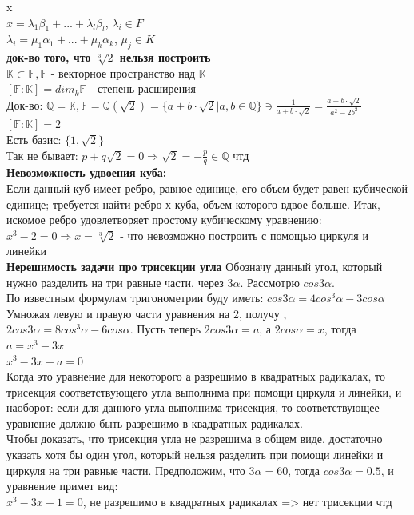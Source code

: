 \documentclass[12pt, oneside]{book}
\theoremstyle{definition}
\begin{document}
\begin{enumerate}
x \\
$x = {\lambda_1}{\beta_1} + ... + {\lambda_l}{\beta_l}$, ${\lambda_i} \in {F}$\\
${\lambda_i} = {\mu_1}{\alpha_1} + ... + {\mu_k}{\alpha_k}$, ${\mu_j} \in {K}$\\
\textbf{док-во того, что $\sqrt[3]{2}$ нельзя построить}\\
$\mathbb{K} \subset \mathbb{F}, \mathbb{F}$ - векторное пространство над $\mathbb{K}$\\
$[\mathbb{F}: \mathbb{K}] = dim_k \mathbb{F}$ - степень расширения \\
Док-во: $\mathbb{Q} = \mathbb{K}, \mathbb{F} = \mathbb{Q} (\sqrt{2}) = \{a + b\cdot \sqrt{2} | a,b \in \mathbb{Q} \} \ni \frac{1}{a+b\cdot \sqrt{2}} = \frac{a-b\cdot \sqrt{2}}{a^2 - 2b^2}$\\
$[\mathbb{F}: \mathbb{K}] = 2$\\
Есть базис: $\{1,\sqrt{2}\}$\\
Так не бывает: $p+q\sqrt{2} = 0 \Longrightarrow \sqrt{2} = -\frac{p}{q} \in \mathbb{Q}$ чтд\\
\textbf{Невозможность удвоения куба:}\\
Если данный куб имеет ребро, равное единице, его объем будет равен кубической единице; требуется найти ребро х куба, объем которого вдвое больше. Итак, искомое ребро удовлетворяет простому кубическому уравнению: $x^3 - 2 = 0 \Longrightarrow x = \sqrt[3]{2}$ - что невозможно построить с помощью циркуля и линейки\\
\textbf{Нерешимость задачи про трисекции угла}
Обозначу данный угол, который нужно разделить на три равные части, через $3\alpha$. Рассмотрю $cos 3\alpha$.\\
По известным формулам тригонометрии буду иметь:
$cos 3\alpha = 4cos^3 \alpha - 3cos \alpha$\\
Умножая левую и правую части уравнения на 2, получу , $2cos 3\alpha = 8cos^3 \alpha - 6cos\alpha$. Пусть теперь $2cos 3\alpha = a$, а $2cos \alpha =x$, тогда $a = x^3 - 3x$\\
$x^3 - 3x - a =0$\\
Когда это уравнение для некоторого а разрешимо в квадратных радикалах, то трисекция соответствующего угла выполнима при помощи циркуля и линейки, и наоборот: если для данного угла выполнима трисекция, то соответствующее уравнение должно быть разрешимо в квадратных радикалах.\\
Чтобы доказать, что трисекция угла не разрешима в общем виде, достаточно указать хотя бы один угол, который нельзя разделить при помощи линейки и циркуля на три равные части. Предположим, что $3\alpha=60$, тогда $cos 3\alpha=0.5$, и уравнение примет вид:\\
$x^3 - 3x - 1 = 0$, не разрешимо в квадратных радикалах => нет трисекции чтд



\end{enumerate}
\end{document}
